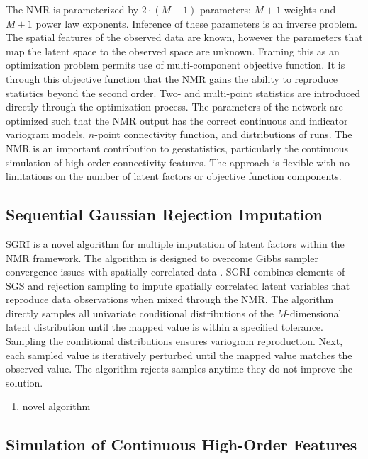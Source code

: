 The \gls{NMR} is parameterized by $2 \cdot (M+1)$ parameters: $M+1$ weights and $M+1$ power law exponents. Inference of these parameters is an inverse problem. The spatial features of the observed data are known, however the parameters that map the latent space to the observed space are unknown. Framing this as an optimization problem permits use of multi-component objective function. It is through this objective function that the \gls{NMR} gains the ability to reproduce statistics beyond the second order. Two- and multi-point statistics are introduced directly through the optimization process. The parameters of the network are optimized such that the \gls{NMR} output has the correct continuous and indicator variogram models, $n$-point connectivity function, and distributions of runs. The \gls{NMR} is an important contribution to geostatistics, particularly the continuous simulation of high-order connectivity features. The approach is flexible with no limitations on the number of latent factors or objective function components.

\subsection{Sequential Gaussian Rejection Imputation}
\label{subsec:07sgri}

\Gls{SGRI} is a novel algorithm for multiple imputation of latent factors within the \gls{NMR} framework. The algorithm is designed to overcome Gibbs sampler convergence issues with spatially correlated data \citep{silva2018enhanced}. \Gls{SGRI} combines elements of \gls{SGS} and rejection sampling to impute spatially correlated latent variables that reproduce data observations when mixed through the \gls{NMR}. The algorithm directly samples all univariate conditional distributions of the $M$-dimensional latent distribution until the mapped value is within a specified tolerance. Sampling the conditional distributions ensures variogram reproduction. Next, each sampled value is iteratively perturbed until the mapped value matches the observed value. The algorithm rejects samples anytime they do not improve the solution.

\begin{enumerate}
    \item novel algorithm
\end{enumerate}

\subsection{Simulation of Continuous High-Order Features}
\label{subsec:07hosim}


